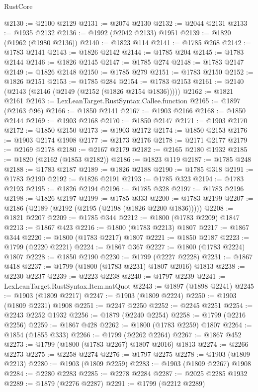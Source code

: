 \begin{lexlean}{RustCore}
\begin{coremodule}
@2130 := @2100 @2129
@2131 := @2074 @2130
@2132 := @2044 @2131
@2133 := @1935 @2132
@2136 := @1992 (@2042 @2133) @1951
@2139 := @1820 (@1962 (@1980 @2136))
@2140 := @1823 @114
@2141 := @1785 @268
@2142 := @1783 @2141
@2143 := @1826 @2142
@2144 := @1785 @204
@2145 := @1783 @2144
@2146 := @1826 @2145
@2147 := @1785 @274
@2148 := @1783 @2147
@2149 := @1826 @2148
@2150 := @1785 @279
@2151 := @1783 @2150
@2152 := @1826 @2151
@2153 := @1785 @284
@2154 := @1783 @2153
@2161 := @2140 (@2143 (@2146 (@2149 (@2152 (@1826 @2154 @1836)))))
@2162 := @1821 @2161
@2163 := LexLeanTarget.RustSyntax.Callee.function
@2165 := @1897 (@2163 @96)
@2166 := @1850 @2141
@2167 := @1903 @2166
@2168 := @1850 @2144
@2169 := @1903 @2168
@2170 := @1850 @2147
@2171 := @1903 @2170
@2172 := @1850 @2150
@2173 := @1903 @2172
@2174 := @1850 @2153
@2176 := @1903 @2174 @1908
@2177 := @2173 @2176
@2178 := @2171 @2177
@2179 := @2169 @2178
@2180 := @2167 @2179
@2182 := @2165 @2180 @1932
@2185 := @1820 (@2162 (@1853 @2182))
@2186 := @1823 @119
@2187 := @1785 @248
@2188 := @1783 @2187
@2189 := @1826 @2188
@2190 := @1785 @318
@2191 := @1783 @2190
@2192 := @1826 @2191
@2193 := @1785 @323
@2194 := @1783 @2193
@2195 := @1826 @2194
@2196 := @1785 @328
@2197 := @1783 @2196
@2198 := @1826 @2197
@2199 := @1785 @333
@2200 := @1783 @2199
@2207 := @2186 (@2189 (@2192 (@2195 (@2198 (@1826 @2200 @1836)))))
@2208 := @1821 @2207
@2209 := @1785 @344
@2212 := @1800 (@1783 @2209) @1847
@2213 := @1867 @423
@2216 := @1800 (@1783 @2213) @1807
@2217 := @1867 @344
@2220 := @1800 (@1783 @2217) @1807
@2221 := @1850 @2187
@2223 := @1799 (@2220 @2221)
@2224 := @1867 @367
@2227 := @1800 (@1783 @2224) @1807
@2228 := @1850 @2190
@2230 := @1799 (@2227 @2228)
@2231 := @1867 @418
@2237 := @1799 (@1800 (@1783 @2231) @1807 @2016) @1813
@2238 := @2230 @2237
@2239 := @2223 @2238
@2240 := @1797 @2239
@2241 := LexLeanTarget.RustSyntax.Item.natQuot
@2243 := @1897 (@1898 @2241)
@2245 := @1903 (@1809 @2217)
@2247 := @1903 (@1809 @2224)
@2250 := @1903 (@1809 @2231) @1908
@2251 := @2247 @2250
@2252 := @2245 @2251
@2254 := @2243 @2252 @1932
@2256 := @1879 (@2240 @2254)
@2258 := @1799 (@2216 @2256)
@2259 := @1867 @428
@2262 := @1800 (@1783 @2259) @1807
@2264 := @1854 (@1855 @333)
@2266 := @1799 (@2262 @2264)
@2267 := @1867 @452
@2273 := @1799 (@1800 (@1783 @2267) @1807 @2016) @1813
@2274 := @2266 @2273
@2275 := @2258 @2274
@2276 := @1797 @2275
@2278 := @1903 (@1809 @2213)
@2280 := @1903 (@1809 @2259)
@2283 := @1903 (@1809 @2267) @1908
@2284 := @2280 @2283
@2285 := @2278 @2284
@2287 := @2025 @2285 @1932
@2289 := @1879 (@2276 @2287)
@2291 := @1799 (@2212 @2289)

\end{coremodule}
\end{lexlean}
